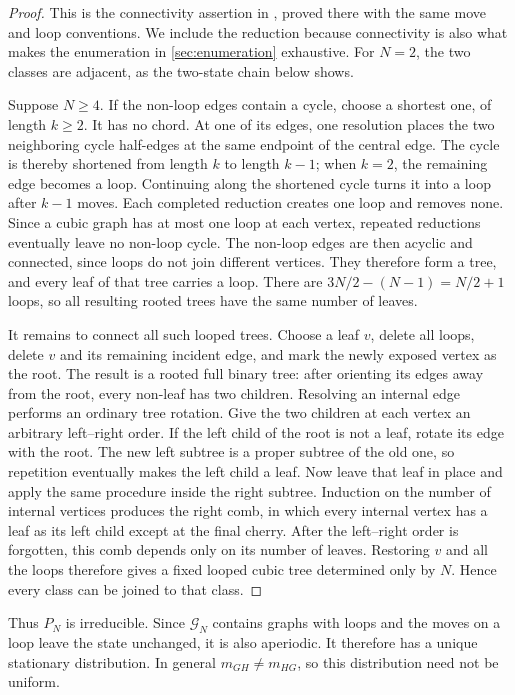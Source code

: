 \documentclass[11pt]{article}
\newcommand{\C}{\mathcal G}
\theoremstyle{plain}
\theoremstyle{definition}
\numberwithin{equation}{section}
\begin{document}
\begin{proof}
This is the connectivity assertion in
\cite[Theorem~2.2]{GraveDePeraltaKolpakov2024}, proved there with the same move
and loop conventions.  We include the reduction because connectivity is also
what makes the enumeration in \cref{sec:enumeration} exhaustive.  For $N=2$,
the two classes are adjacent, as the two-state chain below shows.

Suppose $N\geq4$.  If the non-loop edges contain a cycle, choose a shortest
one, of length $k\geq2$.  It has no chord.  At one of its edges, one resolution
places the two neighboring cycle half-edges at the same endpoint of the
central edge.  The cycle is thereby shortened from length $k$ to length
$k-1$; when $k=2$, the remaining edge becomes a loop.  Continuing along the
shortened cycle turns it into a loop after $k-1$ moves.  Each completed
reduction creates one loop and removes none.  Since a cubic graph has at most
one loop at each vertex, repeated reductions eventually leave no non-loop
cycle.  The non-loop edges are then acyclic and connected, since loops do not
join different vertices.  They therefore form a tree, and every leaf of that
tree carries a loop.  There are $3N/2-(N-1)=N/2+1$ loops, so all resulting
rooted trees have the same number of leaves.

It remains to connect all such looped trees.  Choose a leaf $v$, delete all
loops, delete $v$ and its remaining incident edge, and mark the newly exposed
vertex as the root.  The result is a rooted full binary tree: after orienting
its edges away from the root, every non-leaf has two children.  Resolving an
internal edge performs an ordinary tree rotation.  Give the two children at
each vertex an arbitrary left--right order.  If the left child of the root is
not a leaf, rotate its edge with the root.  The new left subtree is a proper
subtree of the old one, so repetition eventually makes the left child a leaf.
Now leave that leaf in place and apply the same procedure inside the right
subtree.  Induction on the number of internal vertices produces the right
comb, in which every internal vertex has a leaf as its left child except at
the final cherry.  After the left--right order is forgotten, this comb depends
only on its number of leaves.  Restoring $v$ and all the loops therefore gives
a fixed looped cubic tree determined only by $N$.  Hence every class can be
joined to that class.
\end{proof}

Thus $P_N$ is irreducible.  Since $\C_N$ contains graphs with loops and the
moves on a loop leave the state unchanged, it is also aperiodic.  It therefore
has a unique stationary distribution.  In general $m_{GH}\ne m_{HG}$, so this
distribution need not be uniform.
\end{document}
